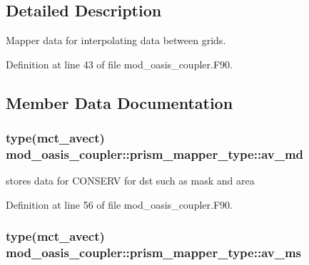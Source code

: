 \subsection{Detailed Description}
Mapper data for interpolating data between grids. 

Definition at line 43 of file mod\+\_\+oasis\+\_\+coupler.\+F90.



\subsection{Member Data Documentation}
\hypertarget{structmod__oasis__coupler_1_1prism__mapper__type_a38134488707455521a0455c537b7b5e1}{
\subsubsection[{av\+\_\+md}]{\setlength{\rightskip}{0pt plus 5cm}type(mct\+\_\+avect) mod\+\_\+oasis\+\_\+coupler\+::prism\+\_\+mapper\+\_\+type\+::av\+\_\+md\hspace{0.3cm}{\ttfamily [private]}}}\label{structmod__oasis__coupler_1_1prism__mapper__type_a38134488707455521a0455c537b7b5e1}


stores data for C\+O\+N\+S\+E\+R\+V for dst such as mask and area 



Definition at line 56 of file mod\+\_\+oasis\+\_\+coupler.\+F90.

\hypertarget{structmod__oasis__coupler_1_1prism__mapper__type_af33fa10111ae337fcc0c016d7c58e0a1}{
\subsubsection[{av\+\_\+ms}]{\setlength{\rightskip}{0pt plus 5cm}type(mct\+\_\+avect) mod\+\_\+oasis\+\_\+coupler\+::prism\+\_\+mapper\+\_\+type\+::av\+\_\+ms\hspace{0.3cm}{\ttfamily [private]}}}\label{structmod__oasis__coupler_1_1prism__mapper__type_af33fa10111ae337fcc0c016d7c58e0a1}


